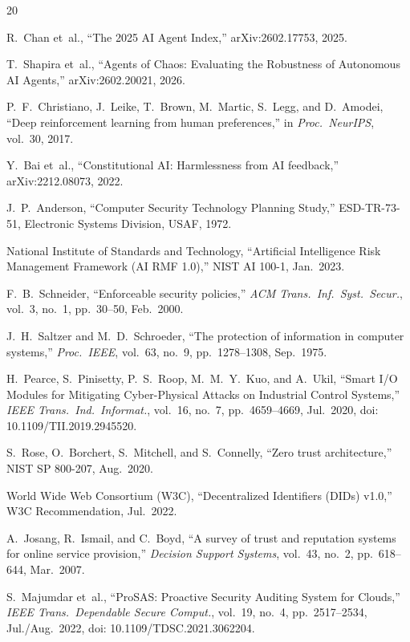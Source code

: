 \documentclass{IEEEcsmag}
\begin{document}
\begin{thebibliography}{20}

R.~Chan et~al., ``The 2025 AI Agent Index,'' arXiv:2602.17753, 2025.

T.~Shapira et~al., ``Agents of Chaos: Evaluating the Robustness of Autonomous AI Agents,'' arXiv:2602.20021, 2026.

P.~F.~Christiano, J.~Leike, T.~Brown, M.~Martic, S.~Legg, and D.~Amodei, ``Deep reinforcement learning from human preferences,'' in {\it Proc.\ NeurIPS}, vol.~30, 2017.

Y.~Bai et~al., ``Constitutional AI: Harmlessness from AI feedback,'' arXiv:2212.08073, 2022.

J.~P.~Anderson, ``Computer Security Technology Planning Study,'' ESD-TR-73-51, Electronic Systems Division, USAF, 1972.

National Institute of Standards and Technology, ``Artificial Intelligence Risk Management Framework (AI RMF 1.0),'' NIST AI 100-1, Jan.\ 2023.

F.~B.~Schneider, ``Enforceable security policies,'' {\it ACM Trans.\ Inf.\ Syst.\ Secur.}, vol.~3, no.~1, pp.~30--50, Feb.\ 2000.

J.~H.~Saltzer and M.~D.~Schroeder, ``The protection of information in computer systems,'' {\it Proc.\ IEEE}, vol.~63, no.~9, pp.~1278--1308, Sep.\ 1975.

H.~Pearce, S.~Pinisetty, P.~S.~Roop, M.~M.~Y.~Kuo, and A.~Ukil, ``Smart I/O Modules for Mitigating Cyber-Physical Attacks on Industrial Control Systems,'' {\it IEEE Trans.\ Ind.\ Informat.}, vol.~16, no.~7, pp.~4659--4669, Jul.\ 2020, doi: 10.1109/TII.2019.2945520.

S.~Rose, O.~Borchert, S.~Mitchell, and S.~Connelly, ``Zero trust architecture,'' NIST SP 800-207, Aug.\ 2020.

World Wide Web Consortium (W3C), ``Decentralized Identifiers (DIDs) v1.0,'' W3C Recommendation, Jul.\ 2022.

A.~Josang, R.~Ismail, and C.~Boyd, ``A survey of trust and reputation systems for online service provision,'' {\it Decision Support Systems}, vol.~43, no.~2, pp.~618--644, Mar.\ 2007.

S.~Majumdar et~al., ``ProSAS: Proactive Security Auditing System for Clouds,'' {\it IEEE Trans.\ Dependable Secure Comput.}, vol.~19, no.~4, pp.~2517--2534, Jul./Aug.\ 2022, doi: 10.1109/TDSC.2021.3062204.


\end{thebibliography}
\end{document}
